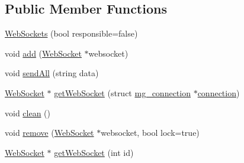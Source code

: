 \subsection*{Public Member Functions}
\begin{DoxyCompactItemize}
\item 
\hyperlink{classMongoose_1_1WebSockets_a7ccfbebe86fcc41f7f42b39f2974a1b2}{Web\+Sockets} (bool responsible=false)
\item 
void \hyperlink{classMongoose_1_1WebSockets_af2e55d2a9877949339e11b26443bbea6}{add} (\hyperlink{classMongoose_1_1WebSocket}{Web\+Socket} $\ast$websocket)
\item 
void \hyperlink{classMongoose_1_1WebSockets_a3560e45954a7459b10650522e3ddce05}{send\+All} (string data)
\item 
\hyperlink{classMongoose_1_1WebSocket}{Web\+Socket} $\ast$ \hyperlink{classMongoose_1_1WebSockets_abc662ddb0f96acf4f197b8411dfd38e3}{get\+Web\+Socket} (struct \hyperlink{structmg__connection}{mg\+\_\+connection} $\ast$\hyperlink{structconnection}{connection})
\item 
void \hyperlink{classMongoose_1_1WebSockets_aa4fc479628df979d1c63ed51fc6bc712}{clean} ()
\item 
void \hyperlink{classMongoose_1_1WebSockets_a41ef753fb1aa658ef3cc53f5ccac6a19}{remove} (\hyperlink{classMongoose_1_1WebSocket}{Web\+Socket} $\ast$websocket, bool lock=true)
\item 
\hyperlink{classMongoose_1_1WebSocket}{Web\+Socket} $\ast$ \hyperlink{classMongoose_1_1WebSockets_a22630d0ceb5dd20207ee9a4715b3e1d9}{get\+Web\+Socket} (int id)
\end{DoxyCompactItemize}
